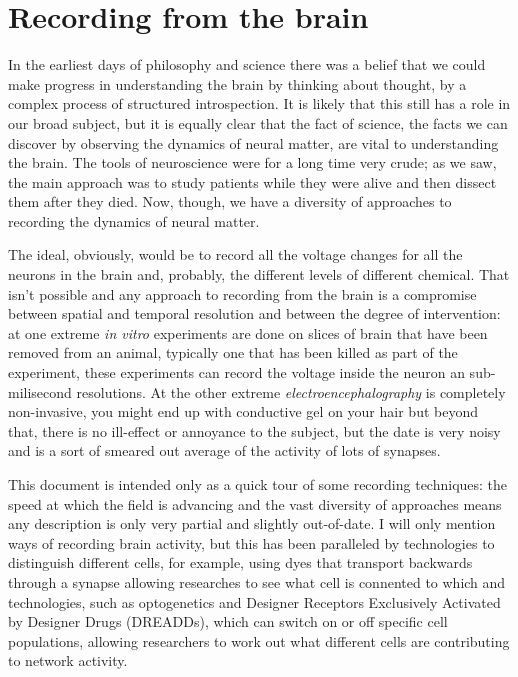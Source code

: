 \documentclass[12pt]{article}
\begin{document}
\section*{Recording from the brain}

In the earliest days of philosophy and science there was a belief that
we could make progress in understanding the brain by thinking about
thought, by a complex process of structured introspection. It is
likely that this still has a role in our broad subject, but it is
equally clear that the fact of science, the facts we can discover by
observing the dynamics of neural matter, are vital to understanding
the brain. The tools of neuroscience were for a long time very crude;
as we saw, the main approach was to study patients while they were
alive and then dissect them after they died. Now, though, we have a
diversity of approaches to recording the dynamics of neural matter.

The ideal, obviously, would be to record all the voltage changes for
all the neurons in the brain and, probably, the different levels of
different chemical. That isn't possible and any approach to recording
from the brain is a compromise between spatial and temporal resolution
and between the degree of intervention: at one extreme \textsl{in
  vitro} experiments are done on slices of brain that have been
removed from an animal, typically one that has been killed as part of
the experiment, these experiments can record the voltage inside the
neuron an sub-milisecond resolutions. At the other extreme
\textsl{electroencephalography} is completely non-invasive, you might
end up with conductive gel on your hair but beyond that, there is no
ill-effect or annoyance to the subject, but the date is very noisy and
is a sort of smeared out average of the activity of lots of synapses.

This document is intended only as a quick tour of some recording
techniques: the speed at which the field is advancing and the vast
diversity of approaches means any description is only very partial and
slightly out-of-date. I will only mention ways of recording brain
activity, but this has been paralleled by technologies to distinguish
different cells, for example, using dyes that transport backwards
through a synapse allowing researches to see what cell is connented to
which and technologies, such as optogenetics and Designer Receptors
Exclusively Activated by Designer Drugs (DREADDs), which can switch on
or off specific cell populations, allowing researchers to work out
what different cells are contributing to network activity.
\end{document}
